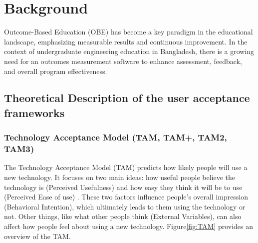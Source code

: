 \documentclass[journal,onecolumn]{IEEEtran}
\begin{document}





\section{\textbf{Background}}
Outcome-Based Education (OBE) has become a key paradigm in the educational landscape, emphasizing measurable results and continuous improvement. In the context of undergraduate engineering education in Bangladesh, there is a growing need for an outcomes measurement software to enhance assessment, feedback, and overall program effectiveness.

\subsection{Theoretical Description of the user acceptance frameworks}

\subsubsection{Technology Acceptance Model (TAM, TAM+, TAM2, TAM3)}

The Technology Acceptance Model (TAM) predicts how likely people will use a new technology. It focuses on two main ideas: how useful people believe the technology is (Perceived Usefulness) and how easy they think it will be to use (Perceived Ease of use) \cite{adams_perceived_1992}. These two factors influence people's overall impression (Behavioral Intention), which ultimately leads to them using the technology or not. Other things, like what other people think (External Variables), can also affect how people feel about using a new technology. Figure\ref{fig:TAM} provides an overview of the TAM.
\end{document}
